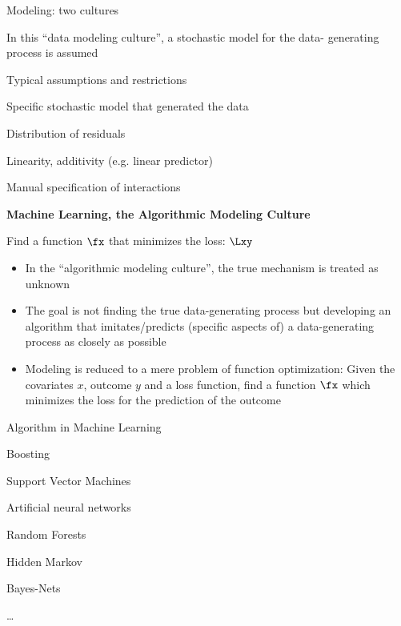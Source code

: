 \begin{vbframe}{Modeling: two cultures}
\framebreak

In this \enquote{data modeling culture}, a stochastic model for the data- generating process is assumed
\begin{blocki}{Typical assumptions and restrictions}
  \item Specific stochastic model that generated the data
  \item Distribution of residuals
  \item Linearity, additivity (e.g. linear predictor)
  \item Manual specification of interactions
\end{blocki}

\framebreak

\textbf{Machine Learning, the Algorithmic Modeling Culture}
\lz
  \begin{center}
  \end{center}
\lz
Find a function $\fx$ that minimizes the loss: $\Lxy$

\framebreak

\begin{itemize}
  \item In the \enquote{algorithmic modeling culture}, the true mechanism is treated as unknown
  \item The goal is not finding the true data-generating process but developing an algorithm that imitates/predicts (specific aspects of) a data-generating process as closely as possible
  \item Modeling is reduced to a mere problem of function optimization: Given the covariates $x$, outcome $y$ and a loss function, find a function $\fx$ which minimizes the loss for the prediction of the outcome
\end{itemize}
\begin{blocki}{Algorithm in Machine Learning}
  \item Boosting
  \item Support Vector Machines
  \item Artificial neural networks
  \item Random Forests
  \item Hidden Markov
  \item Bayes-Nets
  \item \ldots
\end{blocki}


\end{vbframe}
